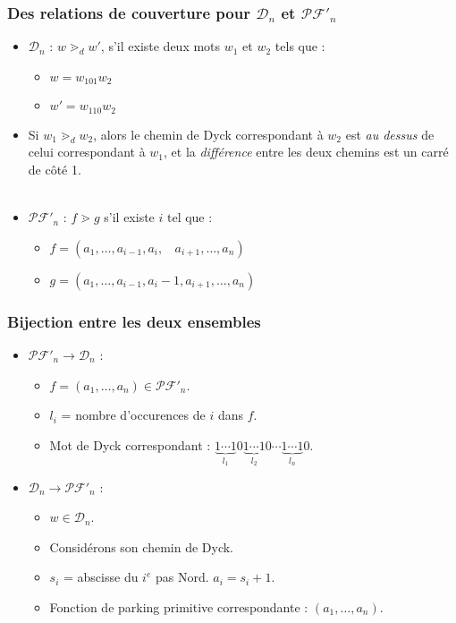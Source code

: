 \documentclass{beamer}
\begin{document}
\begin{frame}
    \frametitle{Des relations de couverture pour $\mathcal{D}_n$ et
        $\mathcal{PF'}_n$}
    \begin{itemize}
        \item $\mathcal{D}_n$ : $w \gtrdot_d w'$, s'il existe deux mots
            $w_1$ et $w_2$ tels que :
        \begin{itemize}
            \item $w = w_101w_2$
            \item $w' = w_110w_2$
        \end{itemize} 
        \item  Si $w_1 \gtrdot_d w_2$, alors le chemin de Dyck correspondant
        à $w_2$ est \emph{au dessus} de celui correspondant à $w_1$, et la
        \emph{différence} entre les deux chemins est un carré de côté 1.
        \\~\\
        \item $\mathcal{PF'}_n$ : $f \gtrdot g$ s'il existe $i$ tel que :
        \begin{itemize}
            \item $f = (a_1, \ldots, a_{i-1}, a_i,\ \ \ \ 
                a_{i+1}, \ldots, a_n)$
            \item $g = (a_1, \ldots, a_{i-1}, a_i - 1, a_{i+1}, \ldots, a_n)$
        \end{itemize}
    \end{itemize}
\end{frame}

\begin{frame}
    \frametitle{\textbf{Bijection} entre les deux ensembles}
    \begin{itemize}
        \item $\mathcal{PF'}_n \to \mathcal{D}_n$ :
        \begin{itemize}
            \item $f = (a_1, \ldots, a_n) \in \mathcal{PF'}_n$.
            \item $l_i$ = nombre d'occurences de $i$ dans $f$.
            \item Mot de Dyck correspondant : $\underbrace{1 \cdots 1}_{l_1}
                0\underbrace{1 \cdots 1}_{l_2}0 \cdots\underbrace{1 \cdots
                1}_{l_n}0$.
        \end{itemize}
        \item $\mathcal{D}_n \to \mathcal{PF'}_n$ :
        \begin{itemize}
            \item $w \in \mathcal{D}_n$.
            \item Considérons son chemin de Dyck.
            \item $s_i$ = abscisse du $i^{e}$ pas Nord. $a_i = s_i + 1$.
            \item Fonction de parking primitive correspondante :
                $(a_1, \ldots, a_n)$.
        \end{itemize}
    \end{itemize}
\end{frame}
\end{document}
